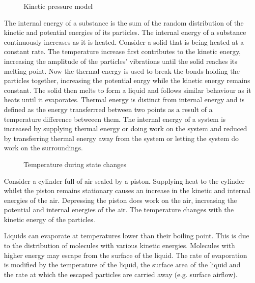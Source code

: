 \documentclass[a4,8pt]{article}
\begin{document}
\begin{figure}[H]
\begin{tikzpicture}
\end{tikzpicture}
\caption{Kinetic pressure model}
\end{figure}

The internal energy of a substance is the sum of the random distribution of the kinetic and potential energies of its particles. The internal energy of a substance continuously increases as it is heated. Consider a solid that is being heated at a constant rate. The temperature increase first contributes to the kinetic energy, increasing the amplitude of the particles' vibrations until the solid reaches its melting point. Now the thermal energy is used to break the bonds holding the particles together, increasing the potential enrgy while the kinetic energy remains constant. The solid then melts to form a liquid and follows similar behaviour as it heats until it evaporates. Thermal energy is distinct from internal energy and is defined as the energy transferrred between two points as a result of a temperature difference betweeen them. The internal energy of a system is increased by supplying thermal energy or doing work on the system and reduced by transferring thermal energy away from the system or letting the system do work on the surroundings.

\begin{figure}[H]
\begin{center}
\caption{Temperature during state changes}
\end{center}
\end{figure}

Consider a cylinder full of air sealed by a piston. Supplying heat to the cylinder whilst the piston remains stationary causes an increase in the kinetic and internal energies of the air. Depressing the piston does work on the air, increasing the potential and internal energies of the air. The temperature changes with the kinetic energy of the particles.

Liquids can evaporate at temperatures lower than their boiling point. This is due to the distribution of molecules with various kinetic energies. Molecules with higher energy may escape from the surface of the liquid. The rate of evaporation is modified by the temperature of the liquid, the surface area of the liquid and the rate at which the escaped particles are carried away (e.g. surface airflow).
\end{document}
